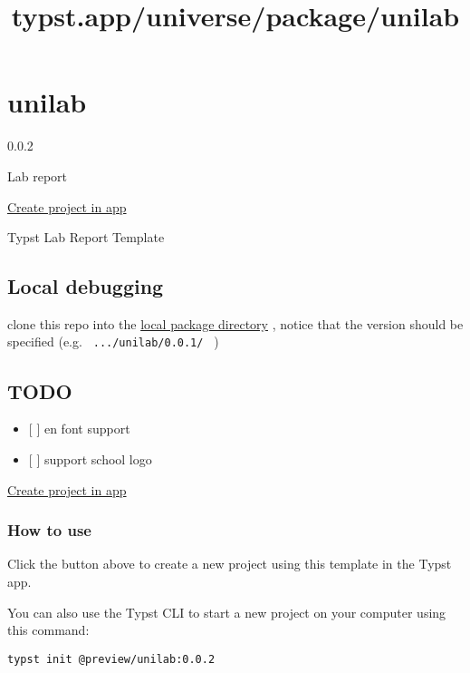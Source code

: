 \title{typst.app/universe/package/unilab}

\label{banner}
\label{template-thumbnail}

\section{unilab}\label{unilab}

{ 0.0.2 }

Lab report

\href{/app?template=unilab&version=0.0.2}{Create project in app}

\label{readme}
Typst Lab Report Template

\subsection{Local debugging}\label{local-debugging}

clone this repo into the
\href{https://github.com/typst/packages?tab=readme-ov-file\#local-packages}{local
package directory} , notice that the version should be specified (e.g.
\texttt{\ .../unilab/0.0.1/\ } )

\subsection{TODO}\label{todo}

\begin{itemize}
\tightlist
\item
  {[} {]} en font support
\item
  {[} {]} support school logo
\end{itemize}

\href{/app?template=unilab&version=0.0.2}{Create project in app}

\subsubsection{How to use}\label{how-to-use}

Click the button above to create a new project using this template in
the Typst app.

You can also use the Typst CLI to start a new project on your computer
using this command:

\begin{verbatim}
typst init @preview/unilab:0.0.2
\end{verbatim}

